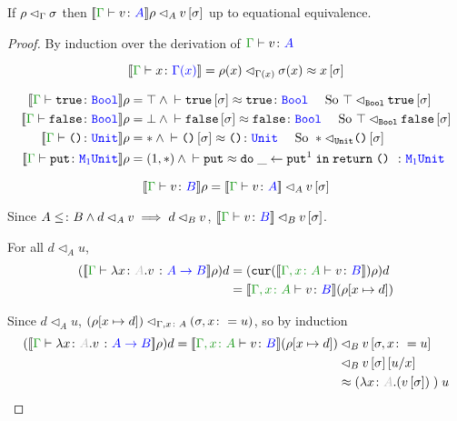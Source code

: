 \documentclass{Report}
\newcommand{\relates}[0]{\lhd}
\newcommand{\logRel}[3]{#1 \relates_{#2} #3}
\newcommand{\zberelation}[3]{\berelation{}{#1}{#2}{#3}}
\renewcommand\put[0]{\texttt{put}}
\begin{document}
\begin{theorem}
    If $\logRel{\rho}{\G}{\si}$ then $\logRel{\deno{\gtyperelation{v}{A}}\rho}{A}{v\ssi}$ up to equational equivalence.    
\end{theorem}

\begin{proof}
    By induction over the derivation of $\gtyperelation{v}{A}$

    \begin{equation}
        \deno{\gtyperelation{x}{\G(x)}} = \logRel{\rho(x)}{\G(x)}{\si(x)}\beequiv x\ssi
    \end{equation}

    \begin{align}
        \deno{\gtyperelation{\t}{\B}} \rho & = \top \wedge \zberelation{\t\ssi}{\t}{\B} \qt{ So } \logRel{\top}{\B}{\t\ssi}\\
        \deno{\gtyperelation{\f}{\B}} \rho & = \bot \wedge \zberelation{\f\ssi}{\f}{\B} \qt{ So } \logRel{\top}{\B}{\f\ssi}\\
        \deno{\gtyperelation{\u}{\U}} \rho & = \singleton \wedge \zberelation{\u\ssi}{\u}{\U} \qt{ So } \logRel{\singleton}{\U}{\u\ssi}\\
        \deno{\gtyperelation{\put}{\M{1}{\U}}} \rho & = (1, \singleton)\wedge \zberelation{\put}{\doin{\_}{\put^1}{\return{\u}}}{\M{1}{\U}}\\ 
    \end{align}



    \begin{equation}
        \deno{\gtyperelation{v}{B}}\rho = \logRel{\deno{\gtyperelation{v}{A}}}{A}{v\ssi}
    \end{equation}

    Since $A\subtype B \wedge \logRel{d}{A}{v} \implies \logRel{d}{B}{v}$, $\logRel{\deno{\gtyperelation{v}{B}}}{B}{v\ssi}$.


    For all $\logRel{d}{A}{u}$, 
    \begin{align}
        (\deno{\gtyperelation{\lam{x}{A}{v}}{\ab}}\rho)d & = (\cur{\deno{\typerelation{\gax}{v}{B}}}\rho)d\\
        & = \deno{\typerelation{\gax}{v}{B}}(\rho[x\mapsto d])\\
    \end{align}

    Since $\logRel{d}{A}{u}$, $\logRel{(\rho[x\mapsto d])}{\gax}{(\si, x\setto u)}$, so by induction
    \begin{align}
        (\deno{\gtyperelation{\lam{x}{A}{v}}{\ab}}\rho)d = \logRel{\deno{\typerelation{\gax}{v}{B}}(\rho[x\mapsto d])&}{B}{v\sub{\si, x\setto u}}
        \\
        \logRel{&}{B}{v\ssi\ssub{x}{u}}\\
        & \beequiv \apply{(\lam{x}{A}{(v\ssi)})}{u}
    \end{align}
\end{proof}
\end{document}
